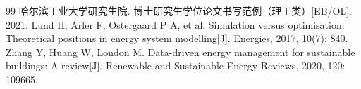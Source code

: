\begin{thebibliography}{99}
 哈尔滨工业大学研究生院. 博士研究生学位论文书写范例（理工类）[EB/OL]. 2021.
 Lund H, Arler F, Ostergaard P A, et al. Simulation versus optimisation: Theoretical positions in energy system modelling[J]. Energies, 2017, 10(7): 840.
 Zhang Y, Huang W, London M. Data-driven energy management for sustainable buildings: A review[J]. Renewable and Sustainable Energy Reviews, 2020, 120: 109665.
\end{thebibliography}
